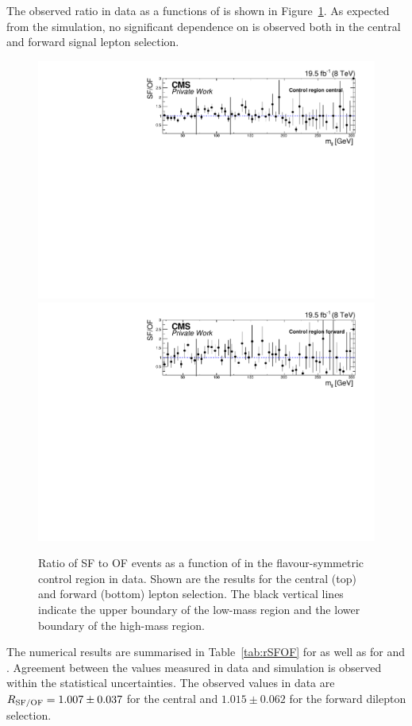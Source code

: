 The observed ratio in data as a functions of \mll is shown in Figure~\ref{fig:controlRatio}. As expected from the simulation, no significant dependence on \mll is observed both in the central and forward signal lepton selection.
\begin{figure}
\begin{center}
\includegraphics[scale=0.5]{plots/BG/control/rSFOF_ControlCentral_Full2012_Mll_None.pdf}\\
\includegraphics[scale=0.5]{plots/BG/control/rSFOF_ControlForward_Full2012_Mll_None.pdf}
\caption{Ratio of SF to OF events as a function of \mll in the flavour-symmetric control region in data. Shown are the results for the central (top) and forward (bottom) lepton selection. The black vertical lines indicate the upper boundary of the low-mass region and the lower boundary of the high-mass region.}
\label{fig:controlRatio}
\end{center}
\end{figure}
The numerical results are summarised in Table~\ref{tab:rSFOF} for \Rsfof as well as for \Reeof and \Rmmof. Agreement between the values measured in data and simulation is observed within the statistical uncertainties. The observed values in data are $R_{\text{SF/OF}} = 1.007\pm0.037$ for the central and $1.015\pm0.062$ for the forward dilepton selection. 

